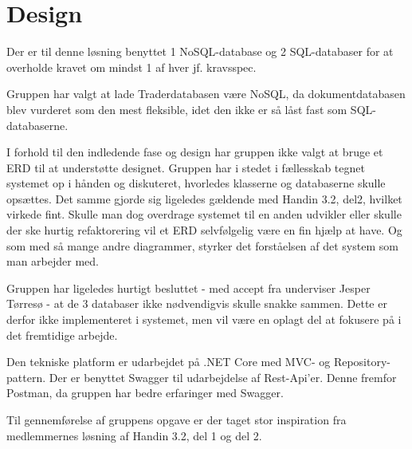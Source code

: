
\section{Design}

Der er til denne løsning benyttet 1 NoSQL-database og 2 SQL-databaser for at overholde kravet om mindst 1 af hver jf. kravsspec.

Gruppen har valgt at lade Traderdatabasen være NoSQL, da dokumentdatabasen blev vurderet som den mest fleksible, idet den ikke er så låst fast som SQL-databaserne.

I forhold til den indledende fase og design har gruppen ikke valgt at bruge et ERD til at understøtte designet. Gruppen har i stedet i fællesskab tegnet systemet op i hånden og diskuteret, hvorledes klasserne og databaserne skulle opsættes. Det samme gjorde sig ligeledes gældende med Handin 3.2, del2, hvilket virkede fint.
Skulle man dog overdrage systemet til en anden udvikler eller skulle der ske hurtig refaktorering vil et ERD selvfølgelig være en fin hjælp at have. Og som med så mange andre diagrammer, styrker det forståelsen af det system som man arbejder med.

Gruppen har ligeledes hurtigt besluttet - med accept fra underviser Jesper Tørresø - at de 3 databaser ikke nødvendigvis skulle snakke sammen.
Dette er derfor ikke implementeret i systemet, men vil være en oplagt del at fokusere på i det fremtidige arbejde.

Den tekniske platform er udarbejdet på .NET Core med MVC- og Repository-pattern.
Der er benyttet Swagger til udarbejdelse af Rest-Api'er. Denne fremfor Postman, da gruppen har bedre erfaringer med Swagger.

Til gennemførelse af gruppens opgave er der taget stor inspiration fra medlemmernes løsning af Handin 3.2, del 1 og del 2.


